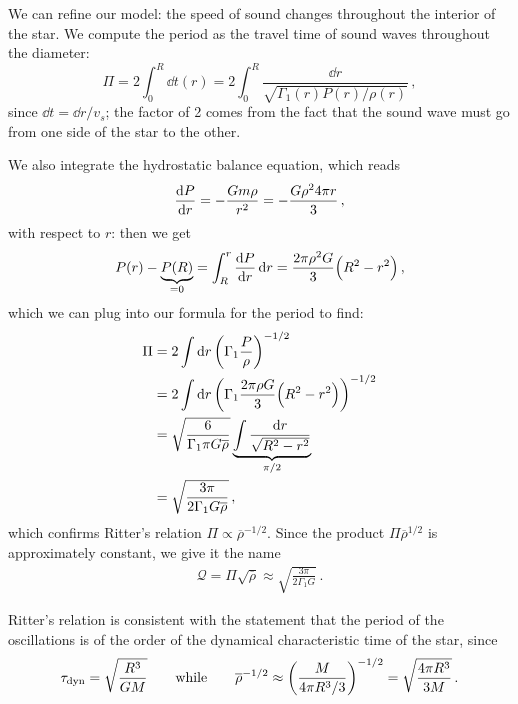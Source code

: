 \documentclass[main.tex]{subfiles}
\begin{document}
We can refine our model: the speed of sound changes throughout the interior of the star.
We compute the period as the travel time of sound waves throughout the diameter:
%
\begin{equation}
  \Pi = 2 \int _{0}   ^{R} \dd{t(r)} = 2 \int_0^R \frac{\dd{r} }{\sqrt{\Gamma_1(r) P(r) / \rho(r)}}\,,
\end{equation}
%
since \(\dd{t} = \dd{r} / v_s\); the factor of 2 comes from the fact that the sound wave must go from one side of the star to the other.

We also integrate the hydrostatic balance equation, which reads 
%
\begin{align}
\dv{P}{r} = - \frac{Gm \rho }{r^2} 
= - \frac{G \rho^2 4 \pi r}{3}
\,,
\end{align}
%
with respect to \(r\): then we get 
%
\begin{align}
P(r) - \underbrace{P(R)}_{=0} = \int_{R}^{r} \dv{P}{r} \dd{r}  = \frac{2 \pi \rho^2 G}{3} \qty(R^2 - r^2)
\,,
\end{align}
%
which we can plug into our formula for the period to find: 
%
\begin{subequations}
\begin{align}
\Pi &= 2 \int \dd{r} \qty(\Gamma_1 \frac{P}{\rho })^{-1/2}  \\
&= 2 \int \dd{r} \qty(\Gamma_1 \frac{2 \pi \rho G}{3} \qty(R^2 - r^2))^{-1/2}  \\
&= \sqrt{\frac{6}{\Gamma_1 \pi G \overline{\rho}}} \underbrace{\int \frac{ \dd{r}}{\sqrt{R^2- r^2}}}_{\pi /2}  \\
&= \sqrt{\frac{3 \pi }{2\Gamma_1 G \overline{\rho} }}
\,,
\end{align}
\end{subequations}
%
which confirms Ritter's relation \(\Pi \propto \overline{\rho}^{-1/2} \).
Since the product \(\Pi \overline{\rho}^{1/2}\) is approximately constant, we give it the name 
%
\begin{align}
\mathcal{Q} = \Pi \sqrt{\overline{\rho}} \approx 
\sqrt{\frac{3 \pi }{2 \Gamma_1 G}} 
\,.
\end{align}

Ritter's relation is consistent with the statement that the period of the oscillations is of the order of the dynamical characteristic time of the star, since 
%
\begin{align}
\tau _{\text{dyn}} = \sqrt{\frac{R^3}{GM}} \qquad \text{while} \qquad \overline{\rho}^{-1/2} \approx \qty(\frac{M}{4 \pi R^3 / 3})^{-1/2} = \sqrt{\frac{4 \pi R^3}{3M}}
\,.
\end{align}
\end{document}
